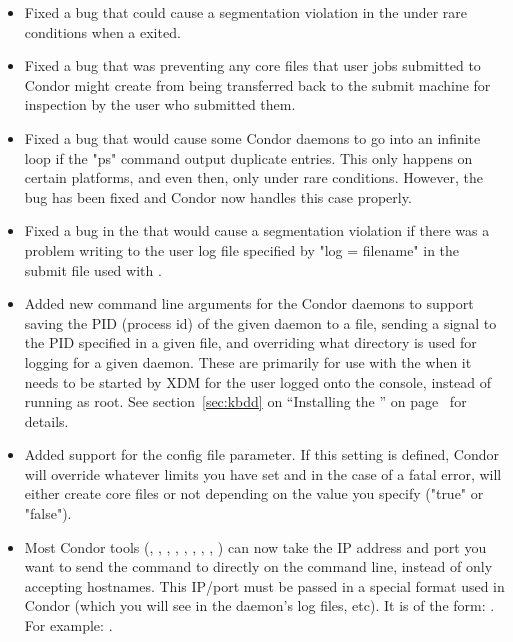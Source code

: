 \begin{itemize}

\item Fixed a bug that could cause a segmentation violation in the 
 under rare conditions when a  exited.

\item Fixed a bug that was preventing any core files that user jobs
submitted to Condor might create from being transferred back to the
submit machine for inspection by the user who submitted them.

\item Fixed a bug that would cause some Condor daemons to go into an
infinite loop if the "ps" command output duplicate entries.
This only happens on certain platforms, and even then, only under rare
conditions.
However, the bug has been fixed and Condor now handles this case
properly.

\item Fixed a bug in the  that would cause a
segmentation violation if there was a problem writing to the user log
file specified by "log = filename" in the submit file used with
.

\item Added new command line arguments for the Condor daemons to support
saving the PID (process id) of the given daemon to a file, sending a
signal to the PID specified in a given file, and overriding what
directory is used for logging for a given daemon.
These are primarily for use with the  when it needs to be
started by XDM for the user logged onto the console, instead of
running as root.
See section~\ref{sec:kbdd} on ``Installing the '' on
page~\pageref{sec:kbdd} for details.

\item Added support for the  config file
parameter.  
If this setting is defined, Condor will override whatever limits you
have set and in the case of a fatal error, will either create core
files or not depending on the value you specify ("true" or "false").

\item Most Condor tools (, ,
, , ,
, , ,
) can now take the IP address and port you want to
send the command to directly on the command line, instead of only
accepting hostnames. 
This IP/port must be passed in a special format used in Condor (which
you will see in the daemon's log files, etc).
It is of the form: .  
For example: .

\end{itemize}

